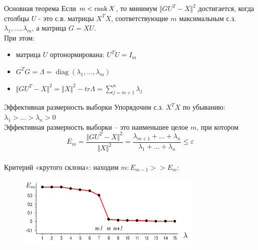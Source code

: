 \documentclass[10pt]{beamer}
\begin{document}
\begin{frame}{Основная теорема}
	Если $m < \operatorname{rank} X$, то минимум $\Vert GU^T - X \Vert^2$ достигается, когда столбцы $U$ - это с.в. матрицы $X^TX$, соответствующие $m$ максимальным с.з. $\lambda_1,\dots, \lambda_m$, а матрица $G = XU$.\\
	\bigbreak
	\pause
	При этом:\\
	\begin{itemize}
		\item матрица $U$ ортонормирована: $U^TU = I_m$
		\item $G^TG = \Lambda = \operatorname{diag}(\lambda_1, \dots, \lambda_m)$
		\item $\Vert GU^T - X \Vert^2 = \Vert X \Vert^2 - tr \Lambda = \sum\limits_{j=m+1}^n \lambda_j$
	\end{itemize}
\end{frame}


\begin{frame}{Эффективная размерность выборки}
	Упорядочим с.з. $X^TX$ по убыванию: $\lambda_1 > \dots > \lambda_n > 0$\\
	Эффективная размерность выборки -- это наименьшее целое $m$, при котором\\
	$$E_m = \frac{\Vert GU^T - X \Vert^2}{\Vert X \Vert^2} = \frac{\lambda_{m+1} + \dots + \lambda_{n}}{\lambda_1 + \dots + \lambda_n} \leq \varepsilon$$\\
	\pause
	Критерий «крутого склона»: находим $m: E_{m-1} >> E_m$:
	\begin{figure}[htbp]
	  \includegraphics[height=100pt, keepaspectratio = true]{images/edge}
	\end{figure}
\end{frame}
\end{document}

